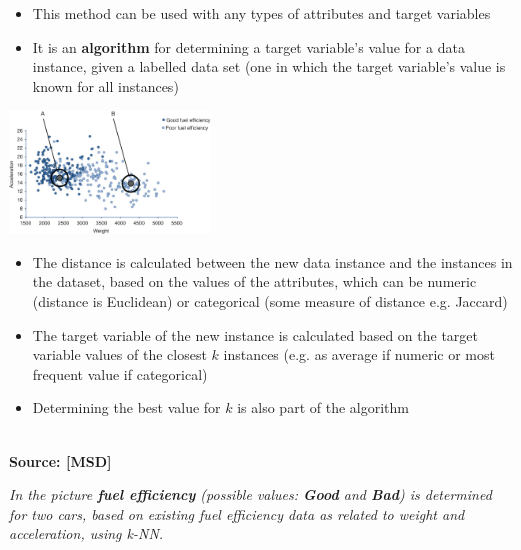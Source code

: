 \begin{itemize}
\item This method can be used with any types of attributes and target variables
\item It is an \textbf{algorithm} for determining a target variable's value for a data instance, given a labelled data set (one in which the target variable's value is known for all instances)
\end{itemize}
\vspace{3ex}
\includegraphics[width=0.4\textwidth]{msd6-13_k_nearest_neighbours.png}\parbox[t]{0.6\textwidth}{\vspace{-20ex}
\begin{itemize}
\item The distance is calculated between the new data instance and the instances in the dataset, based on the values of the attributes, which can be numeric (distance is Euclidean) or categorical (some measure of distance e.g. Jaccard)
\item The target variable of the new instance is calculated based on the target variable values of the closest $k$ instances (e.g. as average if numeric or most frequent value if categorical)
\item Determining the best value for $k$ is also part of the algorithm
\end{itemize}
} \\ [-12.5ex]
{\fontsize{10}{10}\selectfont \textbf{Source: [MSD]}}\\
\parbox[t]{0.4\textwidth}{\tiny \emph{In the picture \textbf{fuel efficiency} (possible values: \textbf{Good} and \textbf{Bad}) is determined for two cars, based on existing fuel efficiency data as related to weight and acceleration, using k-NN.}}
\newpage

